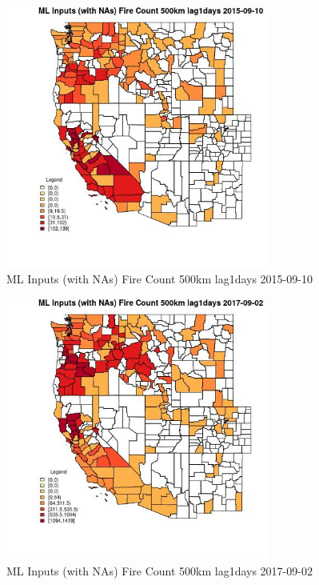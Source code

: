 \begin{figure} 
\centering  
\includegraphics[width=0.77\textwidth]{Code_Outputs/Report_ML_input_PM25_Step4_part_e_de_duplicated_aves_compiled_2019-05-21wNAs_CountyFire_Count_500km_lag1daysMean2015-09-10.jpg} 
\caption{\label{fig:Report_ML_input_PM25_Step4_part_e_de_duplicated_aves_compiled_2019-05-21wNAsCountyFire_Count_500km_lag1daysMean2015-09-10}ML Inputs (with NAs) Fire Count 500km lag1days 2015-09-10} 
\end{figure} 
 

\begin{figure} 
\centering  
\includegraphics[width=0.77\textwidth]{Code_Outputs/Report_ML_input_PM25_Step4_part_e_de_duplicated_aves_compiled_2019-05-21wNAs_CountyFire_Count_500km_lag1daysMean2017-09-02.jpg} 
\caption{\label{fig:Report_ML_input_PM25_Step4_part_e_de_duplicated_aves_compiled_2019-05-21wNAsCountyFire_Count_500km_lag1daysMean2017-09-02}ML Inputs (with NAs) Fire Count 500km lag1days 2017-09-02} 
\end{figure} 
 

